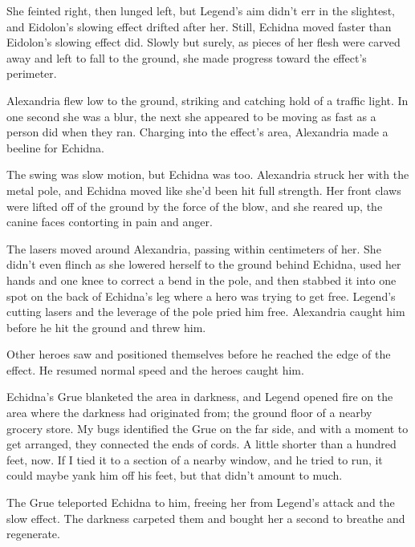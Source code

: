 She feinted right, then lunged left, but Legend's aim didn't err in the slightest, and Eidolon's slowing effect drifted after her.  Still, Echidna moved faster than Eidolon's slowing effect did.  Slowly but surely, as pieces of her flesh were carved away and left to fall to the ground, she made progress toward the effect's perimeter.



Alexandria flew low to the ground, striking and catching hold of a traffic light.  In one second she was a blur, the next she appeared to be moving as fast as a person did when they ran.  Charging into the effect's area, Alexandria made a beeline for Echidna.



The swing was slow motion, but Echidna was too.  Alexandria struck her with the metal pole, and Echidna moved like she'd been hit full strength.  Her front claws were lifted off of the ground by the force of the blow, and she reared up, the canine faces contorting in pain and anger.



The lasers moved around Alexandria, passing within centimeters of her.  She didn't even flinch as she lowered herself to the ground behind Echidna, used her hands and one knee to correct a bend in the pole, and then stabbed it into one spot on the back of Echidna's leg where a hero was trying to get free.  Legend's cutting lasers and the leverage of the pole pried him free.  Alexandria caught him before he hit the ground and threw him.



Other heroes saw and positioned themselves before he reached the edge of the effect.  He resumed normal speed and the heroes caught him.



Echidna's Grue blanketed the area in darkness, and Legend opened fire on the area where the darkness had originated from; the ground floor of a nearby grocery store.  My bugs identified the Grue on the far side, and with a moment to get arranged, they connected the ends of cords.  A little shorter than a hundred feet, now.  If I tied it to a section of a nearby window, and he tried to run, it could maybe yank him off his feet, but that didn't amount to much.



The Grue teleported Echidna to him, freeing her from Legend's attack and the slow effect.  The darkness carpeted them and bought her a second to breathe and regenerate.



